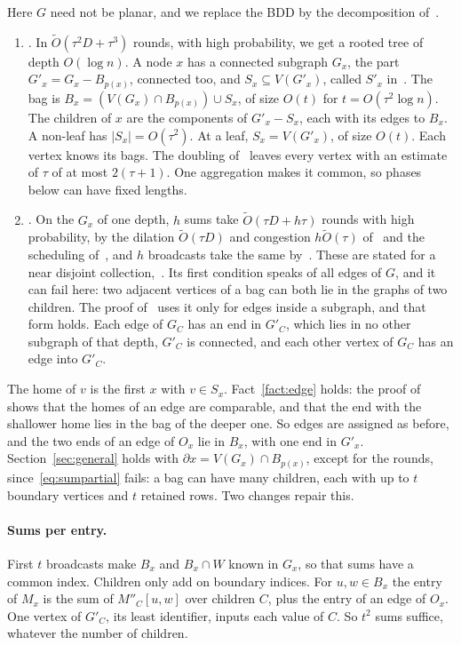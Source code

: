 \documentclass[11pt]{article}
\theoremstyle{definition}
\theoremstyle{remark}
\theoremstyle{plain}
\newcommand{\Ot}{\tilde O}
\begin{document}
Here $G$ need not be planar, and we replace the BDD by the decomposition of~\cite{IKNS22}.
\begin{enumerate}[(T1)]
\item \cite[Theorem 1 and Lemma 13]{IKNS22}. In $\Ot(\tau^2D+\tau^3)$ rounds, with high probability, we get a rooted tree of depth $O(\log n)$. A node $x$ has a connected subgraph $G_x$, the part $G'_x=G_x-B_{p(x)}$, connected too, and
$S_x\subseteq V(G'_x)$, called $S'_x$ in~\cite{IKNS22}. The bag is $B_x=(V(G_x)\cap B_{p(x)})\cup S_x$, of size $O(t)$ for $t=O(\tau^2\log n)$. The children of $x$ are the components of $G'_x-S_x$, each with its edges to $B_x$. A non-leaf has $|S_x|=O(\tau^2)$. At a leaf,
$S_x=V(G'_x)$, of size $O(t)$. Each vertex knows its bags. The doubling of~\cite{IKNS22} leaves every vertex with an estimate of $\tau$ of at most $2(\tau+1)$. One aggregation makes it common, so phases below can have fixed lengths.
\item \cite[Lemma 9, Theorem 6, Corollary 3]{IKNS22}. On the $G_x$ of one depth, $h$ sums take $\Ot(\tau D+h\tau)$ rounds with high probability, by the dilation $\Ot(\tau D)$ and congestion $h\Ot(\tau)$ of~\cite[Lemma 9]{IKNS22} and the scheduling
of~\cite[Theorem 6]{IKNS22}, and $h$ broadcasts take the same by~\cite[Corollary 3]{IKNS22}. These are stated for a near disjoint collection,~\cite[App.~A.1]{IKNS22}. Its first condition speaks of all edges of $G$, and it can fail here: two adjacent
vertices of a bag can both lie in the graphs of two children. The proof of~\cite[Lemma 7]{IKNS22} uses it only for edges inside a subgraph, and that form holds. Each edge of $G_C$ has an end in $G'_C$, which lies in no other subgraph of that
depth, $G'_C$ is connected, and each other vertex of $G_C$ has an edge into $G'_C$.
\end{enumerate}

The home of $v$ is the first $x$ with $v\in S_x$. Fact~\ref{fact:edge} holds: the proof of~\cite[Lemma 13]{IKNS22} shows that the homes of an edge are comparable, and that the end with the shallower home lies in the bag of the deeper one. So edges are
assigned as before, and the two ends of an edge of $O_x$ lie in $B_x$, with one end in $G'_x$. Section~\ref{sec:general} holds with $\partial x=V(G_x)\cap B_{p(x)}$, except for the rounds, since~\eqref{eq:sumpartial} fails: a bag can have many children,
each with up to $t$ boundary vertices and $t$ retained rows. Two changes repair this.

\paragraph{Sums per entry.} First $t$ broadcasts make $B_x$ and $B_x\cap W$ known in $G_x$, so that sums have a common index. Children only add on boundary indices. For $u,w\in B_x$ the entry of $M_x$ is the sum of $M''_C[u,w]$ over children $C$, plus
the entry of an edge of $O_x$. One vertex of $G'_C$, its least identifier, inputs each value of $C$. So $t^2$ sums suffice, whatever the number of children.
\end{document}
